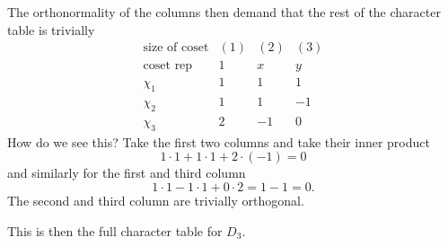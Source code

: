 The orthonormality of the columns then demand that the rest
of the character table is trivially
\begin{equation}
\begin{array}{c|cccc}
\text{size of coset} & (1) & (2) & (3) \\
\text{coset rep} & 1 & x & y\\ \hline
\chi_1           & 1 & 1 & 1\\ 
\chi_2           & 1 & 1 & -1\\
\chi_3           & 2 & -1  & 0
\end{array}
\end{equation}
How do we see this? Take the first two columns and take
their inner product
\begin{equation}
1\cdot1+1\cdot1+2\cdot(-1)=0
\end{equation}
and similarly for the first and third column
\begin{equation}
1\cdot1-1\cdot1+0\cdot2=1-1=0.
\end{equation}
The second and third column are trivially orthogonal.

This is then the full character table for $D_3$. 

